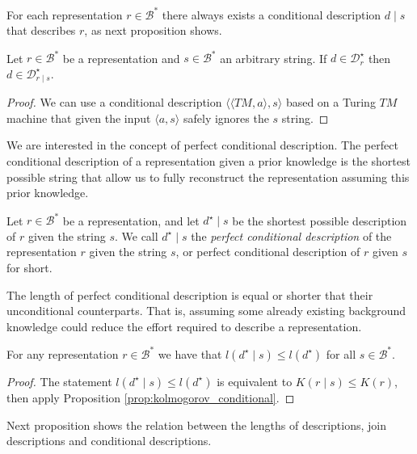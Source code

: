 For each representation $r \in \mathcal{B}^\ast$ there always exists a conditional description $d \mid s$ that describes $r$, as next proposition shows.

\begin{proposition}
Let $r \in \mathcal{B}^\ast$ be a representation and $s \in \mathcal{B}^\ast$ an arbitrary string. If $d \in \mathcal{D}_{r}^\star$ then $d \in \mathcal{D}_{r \mid s}^\star$.
\end{proposition}
\begin{proof}
We can use a conditional description $\langle \langle TM, a \rangle, s \rangle$ based on a Turing $TM$ machine that given the input $\langle a, s \rangle$ safely ignores the $s$ string.
\end{proof}

We are interested in the concept of perfect conditional description. The perfect conditional description of a representation given a prior knowledge is the shortest possible string that allow us to fully reconstruct the representation assuming this prior knowledge.

\begin{definition}
Let $r \in \mathcal{B}^\ast$ be a representation, and let $d^\star \mid s$ be the shortest possible description of $r$ given the string $s$. We call $d^\star \mid s$ the \emph{perfect conditional description} of the representation $r$ given the string $s$, or perfect conditional description of $r$ given $s$ for short.
\end{definition}

The length of perfect conditional description is equal or shorter that their unconditional counterparts. That is, assuming some already existing background knowledge could reduce the effort required to describe a representation.

\begin{proposition}
\label{prop:description_conditional_inequality}
For any representation $r \in \mathcal{B}^\ast$ we have that $l \left( d^\star \mid s \right) \leq l \left( d^\star \right)$ for all $s \in \mathcal{B}^\ast$.
\end{proposition}
\begin{proof}
The statement $l \left( d^\star \mid s \right) \leq l \left( d^\star \right)$ is equivalent to $K(r \mid s) \leq K(r)$, then apply Proposition \ref{prop:kolmogorov_conditional}.
\end{proof}

Next proposition shows the relation between the lengths of descriptions, join descriptions and conditional descriptions.

